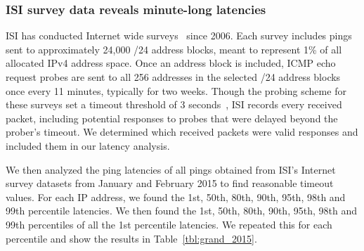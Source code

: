 \subsubsection{ISI survey data reveals minute-long latencies}

ISI has conducted Internet wide
surveys~\cite{census-survey} since 2006. Each survey includes pings sent to approximately 24,000 /24
address blocks, meant to represent 1\% of all allocated IPv4
address space.  Once an address block is included, ICMP echo
request probes are sent to all 256 addresses in the selected
/24 address blocks once every 11 minutes, typically for two
weeks. Though the probing scheme for these surveys set a timeout
threshold of 3 seconds~\cite{census-survey}, ISI records every
received packet, including potential responses to probes that were delayed
beyond the prober's timeout. We determined which received packets were
valid responses and included them in our latency analysis.

We then analyzed the ping latencies of all pings obtained
from ISI's Internet survey datasets from January and February 2015 to find reasonable timeout values. For each IP address, we found the 1st, 50th, 80th,
90th, 95th, 98th and 99th percentile latencies. We then found the 1st, 50th,
80th, 90th, 95th, 98th and 99th percentiles of all the 1st percentile latencies. We repeated this for each
percentile and show the results in Table~\ref{tbl:grand_2015}.

